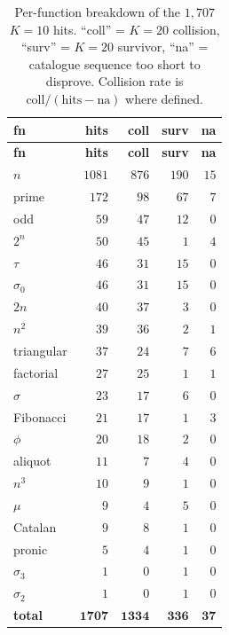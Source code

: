\documentclass[11pt,a4paper]{article}
\newcommand{\sig}{\sigma}
\newcommand{\Kten}{K\!=\!10}
\newcommand{\Ktwenty}{K\!=\!20}
\theoremstyle{definition}
\begin{document}
\begin{longtable}{@{}lrrrr@{}}
\caption{Per-function breakdown of the $1{,}707$ $\Kten$ hits. ``coll'' =
$\Ktwenty$ collision, ``surv'' = $\Ktwenty$ survivor, ``na'' = catalogue
sequence too short to disprove. Collision rate is $\text{coll}/(\text{hits}-\text{na})$
where defined.}
\label{tab:perfn}\\
\toprule
\textbf{fn} & \textbf{hits} & \textbf{coll} & \textbf{surv} & \textbf{na}\\
\midrule
\endfirsthead
\toprule
\textbf{fn} & \textbf{hits} & \textbf{coll} & \textbf{surv} & \textbf{na}\\
\midrule
\endhead
$n$         & $1081$ & $876$ & $190$ & $15$\\
prime       & $172$  & $98$  & $67$  & $7$\\
odd         & $59$   & $47$  & $12$  & $0$\\
$2^n$       & $50$   & $45$  & $1$   & $4$\\
$\tau$      & $46$   & $31$  & $15$  & $0$\\
$\sig_0$    & $46$   & $31$  & $15$  & $0$\\
$2n$        & $40$   & $37$  & $3$   & $0$\\
$n^2$       & $39$   & $36$  & $2$   & $1$\\
triangular  & $37$   & $24$  & $7$   & $6$\\
factorial   & $27$   & $25$  & $1$   & $1$\\
$\sig$      & $23$   & $17$  & $6$   & $0$\\
Fibonacci   & $21$   & $17$  & $1$   & $3$\\
$\phi$      & $20$   & $18$  & $2$   & $0$\\
aliquot     & $11$   & $7$   & $4$   & $0$\\
$n^3$       & $10$   & $9$   & $1$   & $0$\\
$\mu$       & $9$    & $4$   & $5$   & $0$\\
Catalan     & $9$    & $8$   & $1$   & $0$\\
pronic      & $5$    & $4$   & $1$   & $0$\\
$\sig_3$    & $1$    & $0$   & $1$   & $0$\\
$\sig_2$    & $1$    & $0$   & $1$   & $0$\\
\midrule
\textbf{total} & $\mathbf{1707}$ & $\mathbf{1334}$ & $\mathbf{336}$ & $\mathbf{37}$\\
\bottomrule
\end{longtable}
\end{document}
